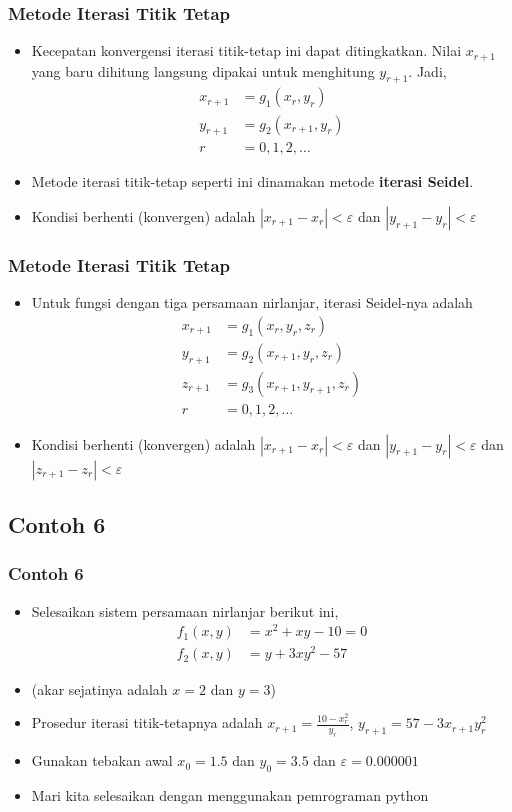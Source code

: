 \documentclass[pdflatex,compress]{beamer}
\begin{document}
\begin{frame}
	\frametitle{Metode Iterasi Titik Tetap}
	\begin{itemize}
		\item Kecepatan konvergensi iterasi titik-tetap ini dapat ditingkatkan. Nilai $ x_{r+1} $ yang baru dihitung langsung dipakai untuk menghitung $ y_{r+1} $. Jadi,
		\begin{align*}
			x_{r+1} &= g_1(x_r,y_r) \\
			y_{r+1} &= g_2(x_{r+1},y_r) \\
			r &= 0, 1, 2, \dots
		\end{align*}
		\item Metode iterasi titik-tetap seperti ini dinamakan metode \textbf{iterasi Seidel}.
		\item Kondisi berhenti (konvergen) adalah $ |x_{r+1} - x_r| < \varepsilon $ dan $ |y_{r+1} - y_r| < \varepsilon $
	\end{itemize}
\end{frame}

\begin{frame}
	\frametitle{Metode Iterasi Titik Tetap}
	\begin{itemize}
		\item Untuk fungsi dengan tiga persamaan nirlanjar, iterasi Seidel-nya adalah
		\begin{align*}
		x_{r+1} &= g_1(x_r,y_r,z_r) \\
		y_{r+1} &= g_2(x_{r+1},y_r,z_r) \\
		z_{r+1} &= g_3(x_{r+1},y_{r+1},z_r) \\
		r &= 0, 1, 2, \dots
		\end{align*}
		\item Kondisi berhenti (konvergen) adalah $ |x_{r+1} - x_r| < \varepsilon $ dan $ |y_{r+1} - y_r| < \varepsilon $ dan $ |z_{r+1} - z_r| < \varepsilon $
	\end{itemize}
\end{frame}

\subsection{Contoh 6}

\begin{frame}
	\frametitle{Contoh 6}
	\begin{itemize}
		\item Selesaikan sistem persamaan nirlanjar berikut ini,
		\begin{align*}
			f_1(x,y) &= x^2 + xy - 10 = 0 \\
			f_2(x,y) &= y + 3xy^2 - 57
		\end{align*}
		\item[] (akar sejatinya adalah $ x = 2 $ dan $ y = 3 $)
		\item Prosedur iterasi titik-tetapnya adalah $ x_{r+1} = \frac{10 - x_r^2}{y_r} $, $ y_{r+1} = 57 - 3x_{r+1} y_r^2 $
		\item Gunakan tebakan awal $ x_0 = 1.5 $ dan $ y_0 = 3.5 $ dan $\varepsilon = 0.000001$
		\item Mari kita selesaikan dengan menggunakan pemrograman python
	\end{itemize}
\end{frame}
\end{document}
